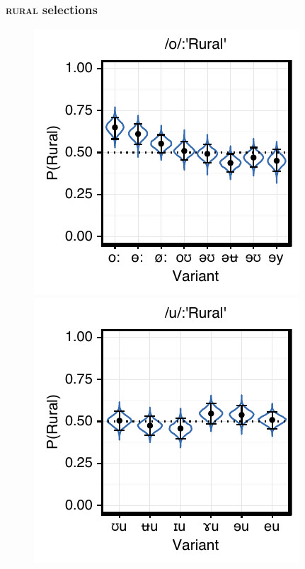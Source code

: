 \documentclass[PWPL]{article}
\begin{document}
\subsubsection{\textsc{rural} selections}
\begin{figure}[ht]
\centering
\includegraphics[scale=0.75]{ow_local.pdf}
\includegraphics[scale=0.75]{uw_local.pdf}
\end{figure}
\end{document}
